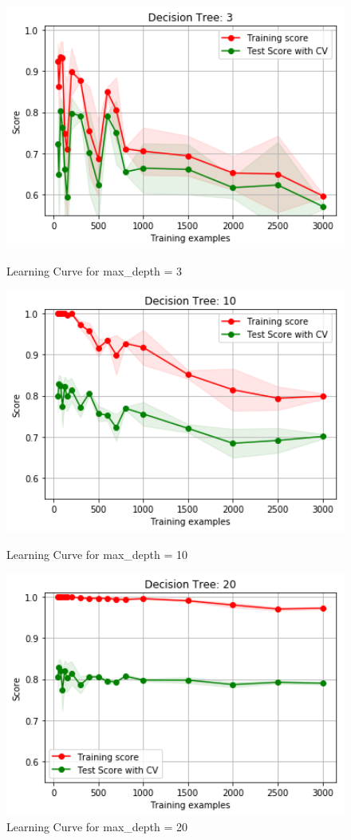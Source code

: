 \documentclass[h]{article}
\begin{document}
\begin{figure}[H]
      \includegraphics[width=1\textwidth,keepaspectratio]{1_curve_dtree3.png} 
      \caption*{Learning Curve for max\_depth = 3} 
   \endminipage\hfill
      \includegraphics[width=1\textwidth,keepaspectratio]{1_curve_dtree10.png} 
      \caption*{Learning Curve for max\_depth = 10} 
   \endminipage\hfill
      \includegraphics[width=1\textwidth,keepaspectratio]{1_curve_dtree20.png} 
      \caption*{Learning Curve for max\_depth = 20} 
   \endminipage\hfill
\end{figure}
\end{document}
